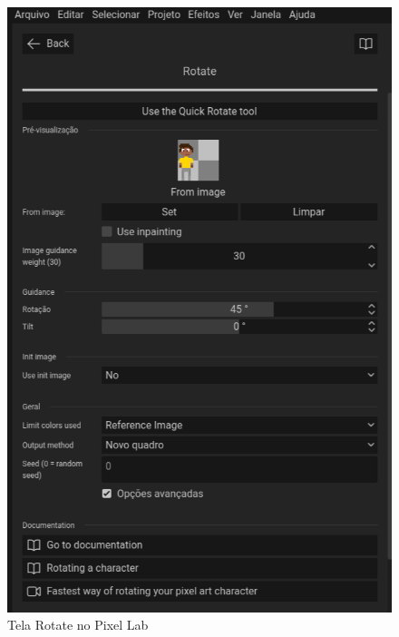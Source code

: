 \begin{figure}[htbp]
    \centering
    \caption{\small Tela Rotate no Pixel Lab}
    \label{fig:pixelLabRotateTela}
    \includegraphics[width=0.4\linewidth]{figs/pixelLab/dia1/rotate.PNG}
\end{figure}

